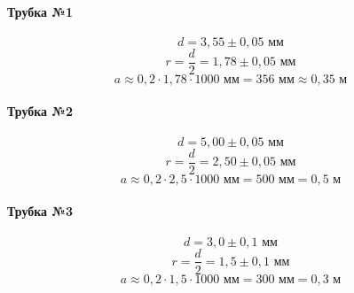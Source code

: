 \documentclass[a4paper]{article}
\begin{document}
	\paragraph{Трубка №1}
	\begin{equation}
		d=3,55\pm 0,05 \text{ мм}
	\end{equation}
	\begin{equation}
		r=\frac{d}{2}=1,78\pm 0,05 \text{ мм}
	\end{equation}
	\begin{equation}
		a\approx 0,2\cdot 1,78 \cdot 1000 \text{ мм}=356\text{ мм}\approx 0,35 \text{ м}
	\end{equation}
	\paragraph{Трубка №2}
	\begin{equation}
		d=5,00\pm 0,05 \text{ мм}
	\end{equation}
	\begin{equation}
		r=\frac{d}{2}=2,50\pm 0,05 \text{ мм}
	\end{equation}
	\begin{equation}
		a\approx 0,2\cdot 2,5 \cdot 1000 \text{ мм}=500\text{ мм}= 0,5 \text{ м}
	\end{equation}
	\paragraph{Трубка №3}
	\begin{equation}
		d=3,0\pm 0,1 \text{ мм}
	\end{equation}
	\begin{equation}
		r=\frac{d}{2}=1,5\pm 0,1 \text{ мм}
	\end{equation}
	\begin{equation}
		a\approx 0,2\cdot 1,5 \cdot 1000 \text{ мм}=300\text{ мм}= 0,3 \text{ м}
	\end{equation}
\end{document}
